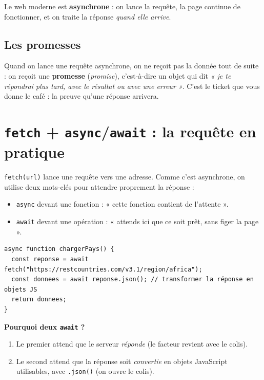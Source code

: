 \documentclass[11pt,a4paper]{article}
\newcommand{\code}[1]{\texttt{#1}}
\begin{document}
Le web moderne est \textbf{asynchrone} : on lance la requête, la page continue de fonctionner, et on traite la réponse \emph{quand elle arrive}.

\subsection{Les promesses}
Quand on lance une requête asynchrone, on ne reçoit pas la donnée tout de suite : on reçoit une \textbf{promesse} (\emph{promise}), c'est-à-dire un objet qui dit \emph{« je te répondrai plus tard, avec le résultat ou avec une erreur »}. C'est le ticket que vous donne le café : la preuve qu'une réponse arrivera.

\section{\texttt{fetch} + \texttt{async}/\texttt{await} : la requête en pratique}

\code{fetch(url)} lance une requête vers une adresse. Comme c'est asynchrone, on utilise deux mots-clés pour attendre proprement la réponse :
\begin{itemize}[leftmargin=*,noitemsep]
  \item \code{async} devant une fonction : « cette fonction contient de l'attente ».
  \item \code{await} devant une opération : « attends ici que ce soit prêt, sans figer la page ».
\end{itemize}

\begin{lstlisting}[style=js]
async function chargerPays() {
  const reponse = await fetch("https://restcountries.com/v3.1/region/africa");
  const donnees = await reponse.json(); // transformer la réponse en objets JS
  return donnees;
}
\end{lstlisting}

\textbf{Pourquoi deux \code{await} ?}
\begin{enumerate}[leftmargin=*,noitemsep]
  \item Le premier attend que le serveur \emph{réponde} (le facteur revient avec le colis).
  \item Le second attend que la réponse soit \emph{convertie} en objets JavaScript utilisables, avec \code{.json()} (on ouvre le colis).
\end{enumerate}
\end{document}
